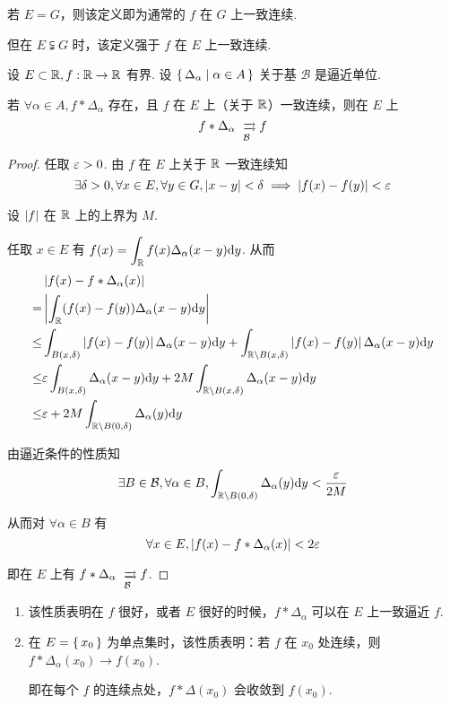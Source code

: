 \begin{hint}
    若 $E=G$，则该定义即为通常的 $f$ 在 $G$ 上一致连续.

    但在 $E\subsetneqq G$ 时，该定义强于 $f$ 在 $E$ 上一致连续.
\end{hint}

\begin{property}
    设 $E\subset\mathbb{R},f:\mathbb{R}\to\mathbb{R}$ 有界. 设 $\set{\Delta_\alpha|\alpha\in A}$ 关于基 $\mathcal{B}$ 是逼近单位.

    若 $\forall\alpha\in A,f*\Delta_\alpha$ 存在，且 $f$ 在 $E$ 上（关于 $\mathbb{R}$）一致连续，则在 $E$ 上
$$
f*\Delta_\alpha\xrightrightarrows[\mathcal{B}]{}f
$$
\end{property}
\begin{proof}
    任取 $\varepsilon>0$. 由 $f$ 在 $E$ 上关于 $\mathbb{R}$ 一致连续知
$$
\exists\delta>0,\forall x\in E,\forall y\in G,\left\lvert{x-y}\right\rvert<\delta\implies\left\lvert{f(x)-f(y)}\right\rvert<\varepsilon
$$

    设 $\left\lvert{f}\right\rvert$ 在 $\mathbb{R}$ 上的上界为 $M$.

    任取 $x\in E$ 有 $f(x)=\displaystyle\int_{\mathbb{R}} f(x)\Delta_\alpha(x-y)\mathrm{d} y$. 从而
$$
\begin{aligned}
    &\left\lvert{f(x)-f*\Delta_\alpha(x)}\right\rvert\\
    =&\left\lvert{\int_{\mathbb{R}}(f(x)-f(y))\Delta_\alpha(x-y)\mathrm{d}y}\right\rvert\\
    \le&\int_{B(x,\delta)}\left\lvert{f(x)-f(y)}\right\rvert\Delta_\alpha(x-y)\mathrm{d} y+\int_{\mathbb{R}\setminus B(x,\delta)}\left\lvert{f(x)-f(y)}\right\rvert\Delta_\alpha(x-y)\mathrm{d} y\\
    \le&\varepsilon\int_{B(x,\delta)}\Delta_\alpha(x-y)\mathrm{d} y+2M\int_{\mathbb{R}\setminus B(x,\delta)}\Delta_\alpha(x-y)\mathrm{d} y\\
    \le&\varepsilon+2M\int_{\mathbb{R}\setminus B(0,\delta)}\Delta_\alpha(y)\mathrm{d} y
\end{aligned}
$$

    由逼近条件的性质知
$$
\exists B\in\mathcal{B},\forall\alpha\in B,\int_{\mathbb{R}\setminus B(0,\delta)}\Delta_\alpha(y)\mathrm{d} y<\frac{\varepsilon}{2M}
$$

    从而对 $\forall\alpha\in B$ 有
$$
\forall x\in E,\left\lvert{f(x)-f*\Delta_\alpha(x)}\right\rvert<2\varepsilon
$$

    即在 $E$ 上有 $f*\Delta_\alpha\xrightrightarrows[\mathcal{B}]{}f$.
\end{proof}

\begin{hint}
    \begin{enumerate}
        \item 该性质表明在 $f$ 很好，或者 $E$ 很好的时候，$f*\Delta_\alpha$ 可以在 $E$ 上一致逼近 $f$.
        
        \item 在 $E=\set{x_0}$ 为单点集时，该性质表明：若 $f$ 在 $x_0$ 处连续，则 $f*\Delta_\alpha(x_0)\to f(x_0)$.
        
        即在每个 $f$ 的连续点处，$f*\Delta(x_0)$ 会收敛到 $f(x_0)$.
    \end{enumerate}
\end{hint}

